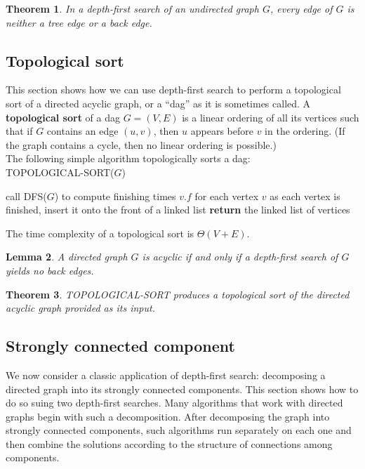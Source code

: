 \documentclass[12pt]{article}
\newtheorem{theorem}{Theorem}
\newtheorem{lemma}[theorem]{Lemma}
\begin{document}
\begin{theorem}
  In a depth-first search of an undirected graph $G$, every edge of $G$ is neither a tree edge or a back edge.
\end{theorem}

\subsection{Topological sort}

This section shows how we can use depth-first search to perform a topological sort of a directed acyclic graph, or a ``dag'' as it is sometimes called. A \textbf{topological sort} of a dag $G = (V,E)$ is a linear ordering of all its vertices such that if $G$ contains an edge $(u,v)$, then $u$ appears before $v$ in the ordering. (If the graph contains a cycle, then no linear ordering is possible.) \\

The following simple algorithm topologically sorts a dag: \\

TOPOLOGICAL-SORT($G$)
\begin{algorithmic} [1]
\State call DFS($G$) to compute finishing times $v.f$ for each vertex $v$
\State as each vertex is finished, insert it onto the front of a linked list
\State \textbf{return } the linked list of vertices 
\end{algorithmic}

The time complexity of a topological sort is $\Theta(V+E)$. \\

\begin{lemma}
  A directed graph $G$ is acyclic if and only if a depth-first search of $G$ yields no back edges.
\end{lemma}

\begin{theorem}
  TOPOLOGICAL-SORT produces a topological sort of the directed acyclic graph provided as its input.
\end{theorem}

\subsection{Strongly connected component}

We now consider a classic application of depth-first search: decomposing a directed graph into its strongly connected components. This section shows how to do so suing two depth-first searches. Many algorithms that work with directed graphs begin with such a decomposition. After decomposing the graph into strongly connected components, such algorithms run separately on each one and then combine the solutions according to the structure of connections among components. \\
\end{document}
